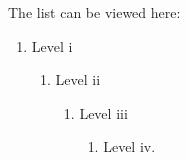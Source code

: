 




The list can be viewed here:

\begin{enumerate}
\item Level i
      \begin{enumerate}
       \item Level ii
          \begin{enumerate}
            \item Level iii
              \begin{enumerate}
                \item Level iv. \lipsum*[1]
              \end{enumerate}
          \end{enumerate}
      \end{enumerate}
\end{enumerate}


